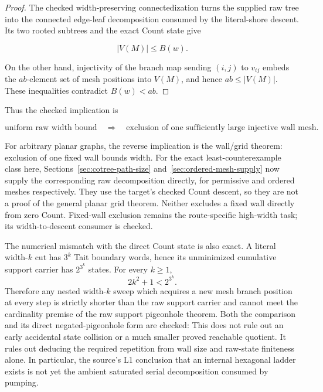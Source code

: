 \begin{proof}
The checked width-preserving connectedization turns the supplied raw tree
into the connected edge-leaf decomposition consumed by the literal-shore
descent.  Its two rooted subtrees and the exact Count state give

\[
                         |V(M)|\le B(w).
\]

On the other hand, injectivity of the branch map sending $(i,j)$ to
$v_{ij}$ embeds the $ab$-element set of mesh positions into $V(M)$, and
hence $ab\le |V(M)|$.  These inequalities contradict $B(w)<ab$.
\end{proof}

Thus the checked implication is

\[
 \text{uniform raw width bound}\quad\Longrightarrow\quad
 \text{exclusion of one sufficiently large injective wall mesh}.
\]

For arbitrary planar graphs, the reverse implication is the wall/grid
theorem: exclusion of one fixed wall bounds width.  For the exact
least-counterexample class here, Sections~\ref{sec:cotree-path-size}
and~\ref{sec:ordered-mesh-supply} now supply the corresponding raw
decomposition directly, for permissive and ordered meshes respectively.
They use the target's checked Count descent, so they are not a proof of the
general planar grid theorem.  Neither excludes a fixed wall directly from
zero Count.  Fixed-wall exclusion remains the route-specific high-width
task; its width-to-descent consumer is checked.

The numerical mismatch with the direct Count state is also exact.  A literal
width-\(k\) cut has \(3^k\) Tait boundary words, hence its unminimized
cumulative support carrier has \(2^{3^k}\) states.  For every \(k\geq1\),
\[
                         2k^2+1 < 2^{3^k}.
\]
Therefore any nested width-\(k\) sweep which acquires a new mesh branch
position at every step is strictly shorter than the raw support carrier and
cannot meet the cardinality premise of the raw support pigeonhole theorem.
Both the comparison and its direct negated-pigeonhole form are checked:
This does not rule out an early accidental state collision or a much smaller
proved reachable quotient.  It rules out deducing the required repetition
from wall size and raw-state finiteness alone.  In particular, the source's
L1 conclusion that an internal hexagonal ladder exists is not yet the ambient
saturated serial decomposition consumed by pumping.

